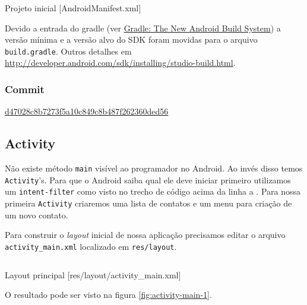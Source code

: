 \begin{listing}[H]
  \inputminted[linenos=true,frame=bottomline,tabsize=3]{ xml }{ source/AndroidManifest-1.xml }
  \caption{Projeto inicial [AndroidManifest.xml]}
  \label{code:android-manifest-1}
\end{listing}

Devido a entrada do \gls{gradle} (ver
\href{http://www.gradleware.com/android/gradle-the-new-android-build-system/}{Gradle:
The New Android Build System}) a versão mínima e a versão alvo do SDK
foram movidas para o arquivo \texttt{build.gradle}. Outros detalhes em
\url{http://developer.android.com/sdk/installing/studio-build.html}.

\subsubsection{Commit}

\href{https://github.com/atilacamurca/guia-aberto-android-contatos/tree/d47028c8b7273f5a10c849c8b487f262360ded56}{d47028c8b7273f5a10c849c8b487f262360ded56}

\subsection{Activity \label{ssec:act}}

Não existe método \texttt{main} visível ao programador no Android. Ao
invés disso temos \texttt{Activity}'s. Para que o Android saiba qual ele
deve iniciar primeiro utilizamos um \texttt{intent-filter} como visto no
trecho de código acima da linha  a . Para nossa
primeira \texttt{Activity} criaremos uma lista de contatos e um menu
para criação de um novo contato.

Para construir o \emph{layout} inicial de nossa aplicação precisamos
editar o arquivo \texttt{activity\_main.xml} localizado em
\texttt{res/layout}.

\begin{listing}[H]
  \inputminted[linenos=true,frame=bottomline,tabsize=3]{ xml }{ source/main-1.xml }
  \caption{Layout principal [res/layout/activity_main.xml]}
\end{listing}

O resultado pode ser visto na figura \ref{fig:activity-main-1}.


